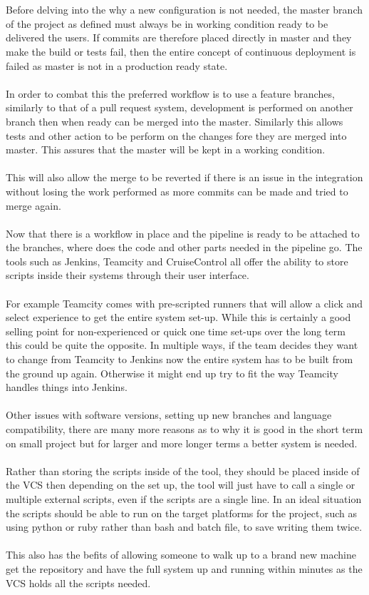 \\\\
Before delving into the why a new configuration is not needed, the master branch of the project as defined must always be in working condition ready to be delivered the users. If commits are therefore placed directly in master and they make the build or tests fail, then the entire concept of continuous deployment is failed as master is not in a  production ready state.
\\\\
In order to combat this the preferred workflow is to use a feature branches, similarly to that of a pull request system, development is performed on another branch then when ready can be merged into the master. Similarly this allows tests and other action to be perform on the changes fore they are merged into master. This assures that the master will be kept in a working condition.
\\\\
This will also allow the merge to be reverted if there is an issue in the integration without losing the work performed as more commits can be made and tried to merge again.
\\\\
Now that there is a workflow in place and the pipeline is ready to be attached to the branches, where does the code and other parts needed in the pipeline go. The tools such as Jenkins, Teamcity and CruiseControl all offer the ability to store scripts inside their systems through their user interface.
\\\\
For example Teamcity comes with pre-scripted runners that will allow a click and select experience to get the entire system set-up. While this is certainly a good selling point for non-experienced or quick one time set-ups over the long term this could be quite the opposite. In multiple ways, if the team decides they want to change from Teamcity to Jenkins now the entire system has to be built from the ground up again. Otherwise it might end up try to fit the way Teamcity handles things into Jenkins.
\\\\
Other issues with software versions, setting up new branches and language compatibility, there are many more reasons as to why it is good in the short term on small project but for larger and more longer terms a better system is needed.
\\\\
Rather than storing the scripts inside of the tool, they should be placed inside of the VCS then depending on the set up, the tool will just have to call a single or multiple external scripts, even if the scripts are a single line. In an ideal situation the scripts should be able to run on the target platforms for the project, such as using python or ruby rather than bash and batch file, to save writing them twice.
\\\\
This also has the befits of allowing someone to walk up to a brand new machine get the repository and have the full system up and running within minutes as the VCS holds all the scripts needed.

